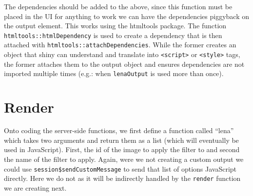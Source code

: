 \documentclass[
]{krantz}
\makeatletter
\newenvironment{Shaded}{\begin{snugshade}}{\end{snugshade}}
\newcommand{\CommentTok}[1]{\textcolor[rgb]{0.37,0.37,0.37}{\textit{#1}}}
\newcommand{\ControlFlowTok}[1]{\textcolor[rgb]{0.27,0.27,0.27}{\textbf{#1}}}
\newcommand{\DataTypeTok}[1]{\textcolor[rgb]{0.27,0.27,0.27}{#1}}
\newcommand{\KeywordTok}[1]{\textcolor[rgb]{0.27,0.27,0.27}{\textbf{#1}}}
\newcommand{\NormalTok}[1]{#1}
\newcommand{\OperatorTok}[1]{\textcolor[rgb]{0.43,0.43,0.43}{\textbf{#1}}}
\newcommand{\StringTok}[1]{\textcolor[rgb]{0.5,0.5,0.5}{#1}}
\newenvironment{kframe}{%
\medskip{}
\setlength{\fboxsep}{.8em}
 \def\at@end@of@kframe{}%
 \ifinner\ifhmode%
  \def\at@end@of@kframe{\end{minipage}}%
  \begin{minipage}{\columnwidth}%
 \fi\fi%
 \def\FrameCommand##1{\hskip\@totalleftmargin \hskip-\fboxsep
 \colorbox{shadecolor}{##1}\hskip-\fboxsep
     \hskip-\linewidth \hskip-\@totalleftmargin \hskip\columnwidth}%
 \MakeFramed {\advance\hsize-\width
   \@totalleftmargin\z@ \linewidth\hsize
   \@setminipage}}%
 {\par\unskip\endMakeFramed%
 \at@end@of@kframe}
\renewenvironment{Shaded}{\begin{kframe}}{\end{kframe}}
\makeatother
\begin{document}
The dependencies should be added to the above, since this function must be placed in the UI for anything to work we can have the dependencies piggyback on the output element. This works using the htmltools package. The function \texttt{htmltools::htmlDependency} is used to create a dependency that is then attached with \texttt{htmltools::attachDependencies}. While the former creates an object that shiny can understand and translate into \texttt{\textless{}script\textgreater{}} or \texttt{\textless{}style\textgreater{}} tags, the former attaches them to the output object and ensures dependencies are not imported multiple times (e.g.: when \texttt{lenaOutput} is used more than once).

\begin{Shaded}
\end{Shaded}

\hypertarget{render}{%
\section{Render}\label{render}}

Onto coding the server-side functions, we first define a function called ``lena'' which takes two arguments and return them as a list (which will eventually be used in JavaScript). First, the id of the image to apply the filter to and second the name of the filter to apply. Again, were we not creating a custom output we could use \texttt{session\$sendCustomMessage} to send that list of options JavaScript directly. Here we do not as it will be indirectly handled by the \texttt{render} function we are creating next.
\end{document}
